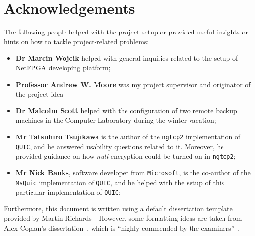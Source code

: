 \documentclass[12pt,a4paper]{report}
\begin{document}




\tableofcontents

\listoffigures

\newpage
\section*{Acknowledgements}

The following people helped with the project setup or provided useful insights or hints on how to tackle project-related problems:
\begin{itemize}
    \item \textbf{Dr Marcin Wojcik} helped with general inquiries related to the setup of NetFPGA developing platform;
    \item \textbf{Professor Andrew W. Moore} was my project supervisor and originator of the project idea;
    \item \textbf{Dr Malcolm Scott} helped with the configuration of two remote backup machines in the Computer Laboratory during the winter vacation;
    \item \textbf{Mr Tatsuhiro Tsujikawa} is the author of the \texttt{ngtcp2} implementation of \texttt{QUIC}, and he answered usability questions related to it. Moreover, he provided guidance on how \textit{null} encryption could be turned on in \texttt{ngtcp2};
    \item \textbf{Mr Nick Banks}, software developer from \texttt{Microsoft}, is the co-author of the \texttt{MsQuic} implementation of \texttt{QUIC}, and he helped with the setup of this particular implementation of \texttt{QUIC};
\end{itemize}

Furthermore, this document is written using a default dissertation template provided by Martin Richards~\cite{how_to_write_a_dissertation_in_LATEX}.
However, some formatting ideas are taken from Alex Coplan's dissertation~\cite{Alex_Coplan_dissertation}, which is \enquote{highly commended by the examiners}~\cite{Computer_Lab_dissertations}.

\end{document}
